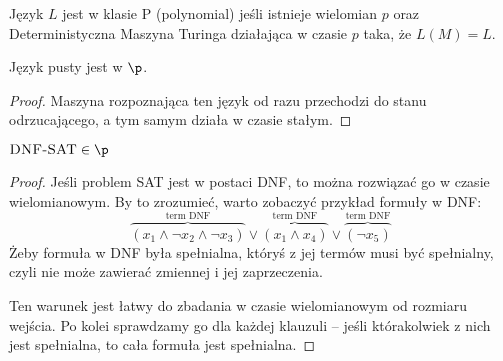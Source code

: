 \begin{definition}
    Język \( L \) jest w klasie P (polynomial) jeśli istnieje wielomian \( p \)
    oraz Deterministyczna Maszyna Turinga działająca w czasie \( p \) taka, że \( L(M) = L \).
\end{definition}

\begin{theorem}
    Język pusty jest w \(\p\). 
\end{theorem}
\begin{proof}
    Maszyna rozpoznająca ten język od razu przechodzi do stanu odrzucającego, a tym samym działa w czasie stałym.
\end{proof}

\begin{theorem}
    \( \textsc{DNF-SAT} \in \p \)
\end{theorem}
\begin{proof}
    Jeśli problem \textsc{SAT} jest w postaci \textsc{DNF}, to można rozwiązać go w czasie wielomianowym.
    By to zrozumieć, warto zobaczyć przykład formuły w \textsc{DNF}:
    \[ 
        \overbrace{(x_1 \land \neg x_2 \land \neg x_3)}^{\text{term DNF}} \lor \overbrace{(x_1 \land x_4)}^{\text{term DNF}} \lor \overbrace{(\neg x_5)}^{\text{term DNF}}    
    \] 
    Żeby formuła w \textsc{DNF} była spełnialna, któryś z jej termów musi być spełnialny, czyli nie może zawierać zmiennej i jej zaprzeczenia.

    Ten warunek jest łatwy do zbadania w czasie wielomianowym od rozmiaru wejścia. Po kolei sprawdzamy go dla każdej klauzuli -- jeśli którakolwiek z nich jest spełnialna, to cała formuła jest spełnialna.
\end{proof}

